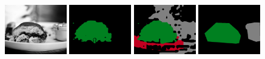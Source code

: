 \begin{figure}[tbh!]
  \centering
  \hspace{4em}
  \hspace{1.5em}
  \hspace{1.5em}
  \vspace{-0.05em}
  \vspace{-0.05em}
  


  
  {\includegraphics[width=0.24\textwidth]{figures/experiments/coco/image/0013.jpg}}
  {\includegraphics[width=0.24\textwidth]{figures/experiments/coco/orgckpt/0013.png}}
  {\includegraphics[width=0.24\textwidth]{figures/experiments/coco/nonnoisy/0013.png}}
  {\includegraphics[width=0.24\textwidth]{figures/experiments/coco/gt/mask.png}}
  

\end{figure}
